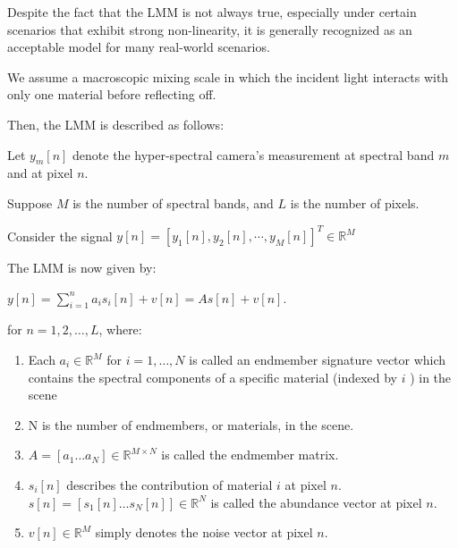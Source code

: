 \documentclass[fleqn, 11pt]{article}
\newcommand{\R}[0]{\mathbb{R}}
\begin{document}
\smallskip

Despite the fact that the LMM is not always true, 
especially under certain scenarios that exhibit strong non-linearity, 
it is generally recognized as an acceptable model 
for many real-world scenarios.

\smallskip

We assume a
macroscopic mixing scale in which the incident light interacts
with only one material before reflecting off.

\medskip

Then, the LMM is described as follows:

\smallskip

Let $y_m[n]$ denote the
hyper-spectral camera’s measurement at spectral band $m$ and at pixel $n$. 

\smallskip

Suppose $M$ is the number of spectral bands, and $L$ is the number of pixels. 

\smallskip

Consider the signal $y[n] = [ y_1[n], y_2[n], \cdots , y_M[n]  ]^T \in \R^M$

\newpage

The LMM is now given by: 

\begin{center}
    $y[n] = \displaystyle \sum_{i=1}^n a_i s_i[n] + v[n] = As[n] + v[n] $.
\end{center}


for $n= 1,2,\ldots, L$,  where:  
\begin{enumerate}
    \item Each $ a_i \in \R^M$ for $i = 1, \ldots, N$ is called an
endmember signature vector which contains the spectral components of a specific material 
(indexed by $i$ ) in the scene

    \item N is the number of endmembers, or materials, in the scene. 

    \item $A = [a_1 \ldots a_N] \in \R^{M \times N}$ is called the endmember matrix. 
    
    \item $s_i[n]$ describes the contribution of material $i$ at pixel $n$.  \\
$s[n] = [ s_1[n] \ldots s_N[n] ] \in \R^N$ is called the abundance vector at
pixel $n$. 

    \item $v[n] \in \R^M $ simply denotes the noise vector at pixel $n$.

\end{enumerate}
\end{document}
